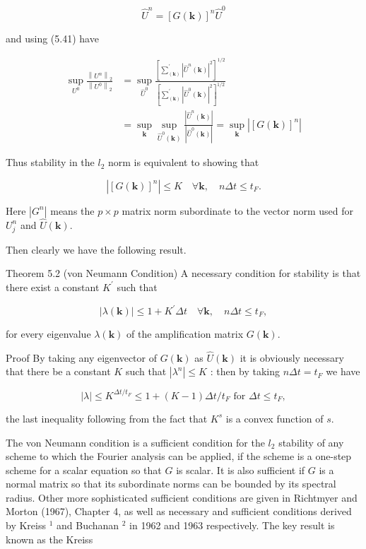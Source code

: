\documentclass[10pt]{article}
\begin{document}
\[
\widehat{U}^{n}=[G(\mathbf{k})]^{n} \widehat{U}^{0}
\]

and using (5.41) have

\[
\begin{aligned}
\sup _{U^{0}} \frac{\left\|U^{n}\right\|_{2}}{\left\|U^{0}\right\|_{2}} & =\sup _{\widehat{U}^{0}} \frac{\left[\sum_{(\mathbf{k})}^{\prime}\left|\widehat{U}^{n}(\mathbf{k})\right|^{2}\right]^{1 / 2}}{\left[\sum_{(\mathbf{k})}^{\prime}\left|\widehat{U}^{0}(\mathbf{k})\right|^{2}\right]^{1 / 2}} \\
& =\sup _{\mathbf{k}} \sup _{\widehat{U}^{0}(\mathbf{k})} \frac{\left|\widehat{U}^{n}(\mathbf{k})\right|}{\left|\widehat{U}^{0}(\mathbf{k})\right|}=\sup _{\mathbf{k}}\left|[G(\mathbf{k})]^{n}\right|
\end{aligned}
\]

Thus stability in the \(l_{2}\) norm is equivalent to showing that

\[
\left|[G(\mathbf{k})]^{n}\right| \leq K \quad \forall \mathbf{k}, \quad n \Delta t \leq t_{F} .
\]

Here \(\left|G^{n}\right|\) means the \(p \times p\) matrix norm subordinate to the vector norm used for \(U_{j}^{n}\) and \(\widehat{U}(\mathbf{k})\).

Then clearly we have the following result.

Theorem 5.2 (von Neumann Condition) A necessary condition for stability is that there exist a constant \(K^{\prime}\) such that

\[
|\lambda(\mathbf{k})| \leq 1+K^{\prime} \Delta t \quad \forall \mathbf{k}, \quad n \Delta t \leq t_{F},
\]

for every eigenvalue \(\lambda(\mathbf{k})\) of the amplification matrix \(G(\mathbf{k})\).

Proof By taking any eigenvector of \(G(\mathbf{k})\) as \(\widehat{U}(\mathbf{k})\) it is obviously necessary that there be a constant \(K\) such that \(\left|\lambda^{n}\right| \leq K\) : then by taking \(n \Delta t=t_{F}\) we have

\[
|\lambda| \leq K^{\Delta t / t_{F}} \leq 1+(K-1) \Delta t / t_{F} \text { for } \Delta t \leq t_{F},
\]

the last inequality following from the fact that \(K^{s}\) is a convex function of \(s\).

The von Neumann condition is a sufficient condition for the \(l_{2}\) stability of any scheme to which the Fourier analysis can be applied, if the scheme is a one-step scheme for a scalar equation so that \(G\) is scalar. It is also sufficient if \(G\) is a normal matrix so that its subordinate norms can be bounded by its spectral radius. Other more sophisticated sufficient conditions are given in Richtmyer and Morton (1967), Chapter 4, as well as necessary and sufficient conditions derived by Kreiss \({ }^{1}\) and Buchanan \({ }^{2}\) in 1962 and 1963 respectively. The key result is known as the Kreiss
\end{document}
